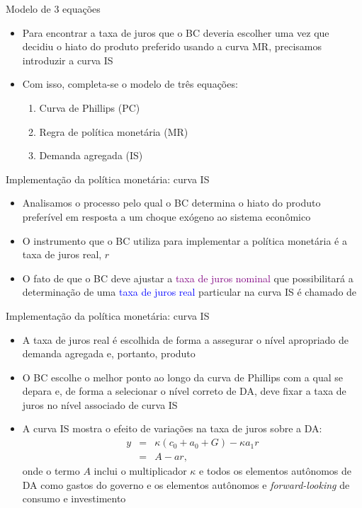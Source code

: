 \documentclass[10pt]{beamer}
\begin{document}
\begin{frame}
    {Modelo de 3 equações}
    \begin{itemize}
        \item Para encontrar a taxa de juros que o BC deveria escolher uma vez que decidiu o hiato do produto preferido usando a curva MR, precisamos introduzir a curva IS\bigskip
        \item Com isso, completa-se o modelo de três equações:\bigskip
        \begin{enumerate}
            \item Curva de Phillips (PC)\medskip
            \item Regra de política monetária (MR)\medskip
            \item Demanda agregada (IS)
        \end{enumerate}
    \end{itemize}
\end{frame}

\begin{frame}
    {Implementação da política monetária: curva IS}
    \begin{itemize}
        \item Analisamos o processo pelo qual o BC determina o hiato do produto preferível em resposta a um choque exógeno ao sistema econômico\bigskip
        \item O instrumento que o BC utiliza para implementar a política monetária é a taxa de juros real, $r$\bigskip
        \item O fato de que o BC deve ajustar a \textcolor{purple}{taxa de juros nominal} que possibilitará a determinação de uma \textcolor{blue}{taxa de juros real} particular na curva IS é chamado de 
    \end{itemize}
\end{frame}

\begin{frame}
    {Implementação da política monetária: curva IS}
    \begin{itemize}
        \item A taxa de juros real é escolhida de forma a assegurar o nível apropriado de demanda agregada e, portanto, produto\bigskip
        \item O BC escolhe o melhor ponto ao longo da curva de Phillips com a qual se depara e, de forma a selecionar o nível correto de DA, deve fixar a taxa de juros no nível associado de curva IS\bigskip
        \item A curva IS mostra o efeito de variações na taxa de juros sobre a DA:
        \begin{eqnarray}
            y &=& \kappa(c_0 + a_0 + G) - \kappa a_1 r \nonumber \\
            &=& A - ar,
        \end{eqnarray}
        onde o termo $A$ inclui o multiplicador $\kappa$ e todos os elementos autônomos de DA como gastos do governo e os elementos autônomos e \emph{forward-looking} de consumo e investimento
    \end{itemize}
\end{frame}
\end{document}
